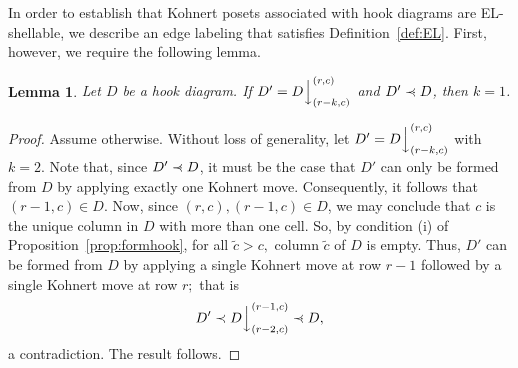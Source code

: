 \documentclass[letterpaper,10pt]{article}
\newtheorem{lemma}[theorem]{Lemma}
\newcommand{\rn}[1]{{\color{red} #1}}
\newcommand{\ldownarrow}{\Big\downarrow}
\newcommand{\precdot}{\prec\mathrel{\mkern-5mu}\mathrel{\cdot}}
\begin{document}
In order to establish that Kohnert posets associated with hook diagrams are EL-shellable, we describe an edge labeling that satisfies Definition~\ref{def:EL}. First, however, we require the following lemma.

\begin{lemma}\label{lem: hook covering} Let $D$ be a hook diagram. If $D'=D\ldownarrow^{(r,c)}_{(r-k,c)}$ and $D'\precdot D$, then $k=1$.
\end{lemma}
\begin{proof} Assume otherwise. Without loss of generality, let $D'=D\ldownarrow^{(r,c)}_{(r-k,c)}$ with $k=2.$ Note that, since $D'\precdot D$, it must be the case that $D'$ can only be formed from $D$ by applying exactly one Kohnert move. Consequently, it follows that $(r-1,c)\in D$. Now, since $(r,c),(r-1,c)\in D$, we may conclude that $c$ is the unique column in $D$ with more than one cell. So, by condition (i) of Proposition~\ref{prop:formhook}, for all $\tilde{c}>c,$ column $\tilde{c}$ of $D$ is empty. Thus, $D'$ can be formed from $D$ by applying a single Kohnert move at row $r-1$ followed by a single Kohnert move at row $r;$ that is $$D'\prec D\ldownarrow^{(r-1,c)}_{(r-2,c)}\precdot D,$$ a contradiction. The result follows.





\end{proof}
\end{document}
